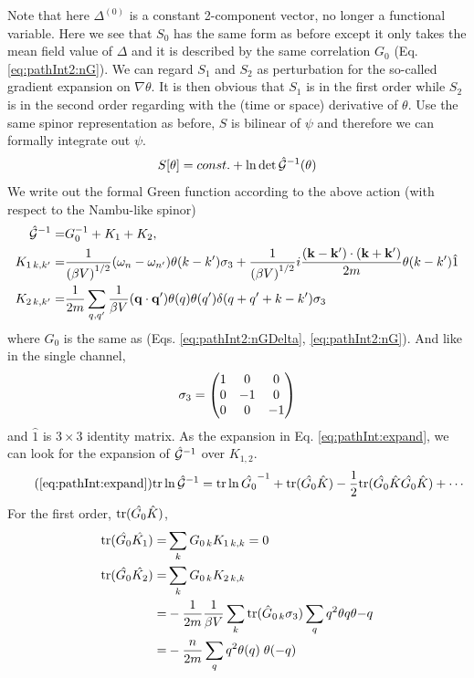 Note that here $\Delta^{(0)}$ is a constant 2-component vector, no longer a functional variable.  Here we see that $S_{0}$ has the same form as before except it only takes the mean field value of $\Delta$ and it is described by the same correlation $G_{0}$ (Eq. \ref{eq:pathInt2:nG}).  We can regard $S_{1}$ and $S_{2}$ as perturbation for the so-called gradient expansion on $\nabla\theta$.  It is then obvious that $S_{1}$ is in the first order while $S_{2}$ is in the second order regarding with the (time or space) derivative of $\theta$.  Use the same spinor representation as before, $S$ is bilinear of $\psi$ and therefore we can formally integrate out $\psi$. 
\begin{equation}
S[\theta]=const.+\ln\det\hat{\mathcal{G}}^{-1}(\theta)
\end{equation}
 We write out the formal Green function according to the above action (with respect to the Nambu-like spinor)
\begin{subequations}
\begin{align}
\hat{\mathcal{G}}^{-1}=&G_{0}^{-1}+K_{1}+K_{2},\\
K_{1\, k,k'}=
	&\frac{1}{({\beta{}V)}^{1/2}}(\omega_n-\omega_{n'})\theta(k-k')\sigma_3+
		\frac{1}{{(\beta{}V)}^{1/2}}i\frac{(\mathbf{k}-\mathbf{k}')\cdot(\mathbf{k}+\mathbf{k}')}{2m}\theta(k-k')\hat{1}\\
K_{2\, k,k'}=
	&\frac{1}{2m}\sum_{q,q'}\frac{1}{{\beta{}V}}(\mathbf{q}\cdot\mathbf{q}')\theta(q)\theta(q')\delta(q+q'+k-k')\sigma_3
\end{align}
\end{subequations}
where $G_{0}$ is the same as (Eqs. \ref{eq:pathInt2:nGDelta}, \ref{eq:pathInt2:nG}).  And like in the single channel, 
\begin{equation}
\sigma_3=\begin{pmatrix}1&0&0\\0&-1&0\\0&0&-1\end{pmatrix}
\end{equation}
and $\hat{1}$ is $3\times3$ identity matrix.  As the expansion in Eq. \ref{eq:pathInt:expand}, we can look for the expansion of $\hat{\mathcal{G}}^{-1}$ over $K_{1,2}$.  
\begin{equation}\tag{\ref{eq:pathInt:expand}}
\tr\ln \nG=\tr\ln\hat{G_{0}}^{-1}+\tr(\hat{G_{0}}\hat{K})-\nth{2}\tr(\hat{G_{0}}\hat{K}\hat{G_{0}}\hat{K})+\cdots
\end{equation}
For the first order, $\text{tr}(\hat{G_{0}}\hat{K})$, 
\begin{align}
\text{tr}(\hat{G_{0}}\hat{K_1})=&\sum_{k}{G_{0\,k}K_{1\,k,k}}=0\\
\text{tr}(\hat{G_{0}}\hat{K_2})=&\sum_{k}{G_{0\,k}K_{2\,k,k}}\nonumber\\
	=&-\frac{1}{2m}\frac{1}{{\beta{}V}}\sum_{k}\text{tr}(\hat{G}_{0\,k}\sigma_3)\sum_{q}q^2\theta{q}\theta{-q}\nonumber\\
	=&-\frac{n}{2m}\sum_{q}q^2\theta{(q)}\;\theta{(-q)}
\end{align}
